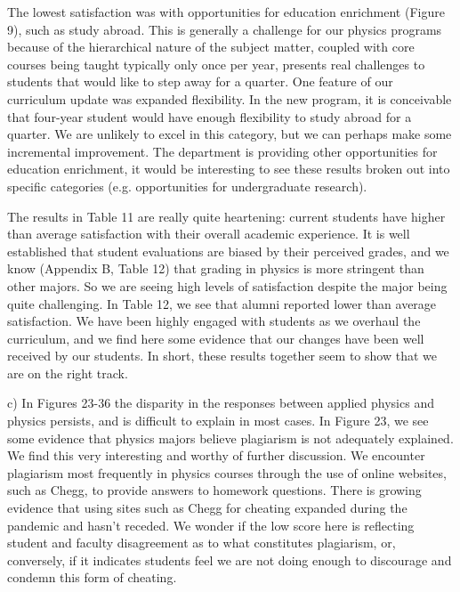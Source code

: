 \documentclass[12pt]{article}
\begin{document}
The lowest satisfaction was with opportunities for education enrichment (Figure 9), such as study abroad.  This is generally a challenge for our physics programs because of the hierarchical nature of the subject matter, coupled with core courses being taught typically only once per year, presents real challenges to students that would like to step away for a quarter.  One feature of our curriculum update was expanded flexibility.  In the new program, it is conceivable that four-year student would have enough flexibility to study abroad for a quarter.  We are unlikely to excel in this category, but we can perhaps make some incremental improvement.  The department is providing other opportunities for education enrichment, it would be interesting to see these results broken out into specific categories (e.g. opportunities for undergraduate research).

The results in Table 11 are really quite heartening: current students have higher than average satisfaction with their overall academic experience.  It is well established that student evaluations are biased by their perceived grades, and we know (Appendix B, Table 12) that grading in physics is more stringent than other majors.  So we are seeing high levels of satisfaction despite the major being quite challenging.  In Table 12, we see that alumni reported lower than average satisfaction.  We have been highly engaged with students as we overhaul the curriculum, and we find here some evidence that our changes have been well received by our students.  In short, these results together seem to show that we are on the right track.

c) In Figures 23-36 the disparity in the responses between applied physics and physics persists, and is difficult to explain in most cases.  In Figure 23, we see some evidence that physics majors believe plagiarism is not adequately explained.  We find this very interesting and worthy of further discussion.  We encounter plagiarism most frequently in physics courses through the use of online websites, such as Chegg, to provide answers to homework questions.  There is growing evidence that using sites such as Chegg for cheating expanded during the pandemic and hasn't receded.  We wonder if the low score here is reflecting student and faculty disagreement as to what constitutes plagiarism, or, conversely, if it indicates students feel we are not doing enough to discourage and condemn this form of cheating.
\end{document}
